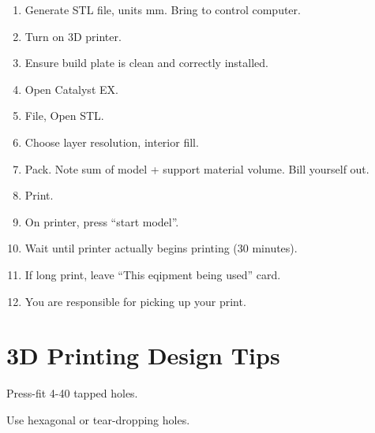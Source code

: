\documentclass{training}
\begin{document}
\begin{enumerate}
    \item Generate STL file, units mm. Bring to control computer.
    \item Turn on 3D printer.
    \item Ensure build plate is clean and correctly installed.
    \item Open Catalyst EX.
    \item File, Open STL.
    \item Choose layer resolution, interior fill.
    \item Pack. Note sum of model + support material volume. Bill yourself out.
    \item Print.
    \item On printer, press ``start model''.
    \item Wait until printer actually begins printing (30 minutes).
    \item If long print, leave ``This eqipment being used'' card.
    \item You are responsible for picking up your print.
\end{enumerate}

\section{3D Printing Design Tips}

Press-fit 4-40 tapped holes.

Use hexagonal or tear-dropping holes.


\end{document}
